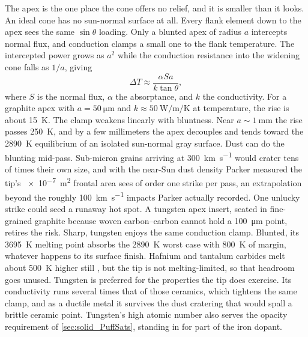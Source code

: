 \documentclass{article}
\begin{document}
The apex is the one place the cone offers no relief, and it is smaller than it looks. An ideal cone has no sun-normal surface at all.  Every flank element down to the apex sees the same $\sin\theta$ loading. Only a blunted apex of radius $a$ intercepts normal flux, and conduction clamps a small one to the flank temperature. The intercepted power grows as $a^2$ while the conduction resistance into the widening cone falls as $1/a$, giving
\begin{equation}
\Delta T \approx \frac{\alpha S a}{k \tan\theta},
\end{equation}
where $S$ is the normal flux, $\alpha$ the absorptance, and $k$ the conductivity. For a graphite apex with $a = \SI{50}{\micro\meter}$ and $k \approx \SI{50}{\watt\per\meter\per\kelvin}$ at temperature, the rise is about \SI{15}{\kelvin}. The clamp weakens linearly with bluntness. Near $a \sim \SI{1}{\milli\meter}$ the rise passes \SI{250}{\kelvin}, and by a few millimeters the apex decouples and tends toward the \SI{2890}{\kelvin} equilibrium of an isolated sun-normal gray surface. Dust can do the blunting mid-pass. Sub-micron grains arriving at \SI{300}{\kilo\meter\per\second} would crater tens of times their own size, and with the near-Sun dust density Parker measured \cite{szalay2020_near_sun_dust} the tip's \SI{e-7}{\square\meter} frontal area sees of order one strike per pass, an extrapolation beyond the roughly \SI{100}{\kilo\meter\per\second} impacts Parker actually recorded. One unlucky strike could seed a runaway hot spot. A tungsten apex insert, seated in fine-grained graphite because woven carbon--carbon cannot hold a \SI{100}{\micro\meter} point, retires the risk. Sharp, tungsten enjoys the same conduction clamp. Blunted, its \SI{3695}{\kelvin} melting point \cite{crc_handbook} absorbs the \SI{2890}{\kelvin} worst case with \SI{800}{\kelvin} of margin, whatever happens to its surface finish. Hafnium and tantalum carbides melt about \SI{500}{\kelvin} higher still \cite{uhtcmc_review}, but the tip is not melting-limited, so that headroom goes unused. Tungsten is preferred for the properties the tip does exercise. Its conductivity runs several times that of those ceramics, which tightens the same clamp, and as a ductile metal it survives the dust cratering that would spall a brittle ceramic point. Tungsten's high atomic number also serves the opacity requirement of \autoref{sec:solid_PuffSats}, standing in for part of the iron dopant.
\end{document}
